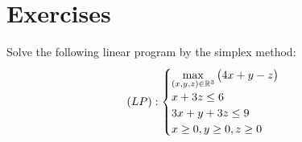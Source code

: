 
\section*{Exercises}

\begin{problem}[Basic]
Solve the following linear program by the simplex method:
\begin{equation*}
(LP): \begin{cases}
\displaystyle{\max_{(x,y,z) \in \mathbb{R}^3} \big( 4x+y-z \big)} \\
x+3z \leq 6 \\
3x+y+3z \leq 9 \\
x \geq 0, y\geq 0, z\geq 0
\end{cases}
\end{equation*}
\end{problem}

